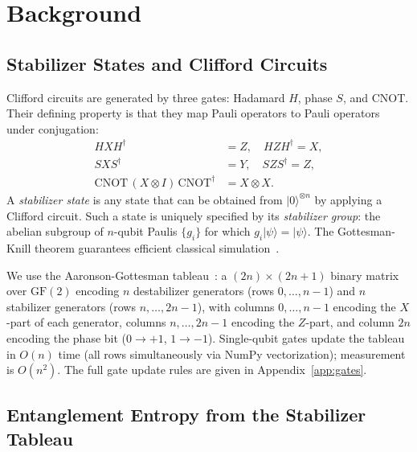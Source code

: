 \documentclass[twocolumn,prl,aps,floatfix]{revtex4-2}
\begin{document}
\section{Background}
\label{sec:background}

\subsection{Stabilizer States and Clifford Circuits}

Clifford circuits are generated by three gates: Hadamard $H$, phase $S$, and CNOT.
Their defining property is that they map Pauli operators to Pauli operators under
conjugation:
\begin{align}
  H X H^\dagger &= Z, \quad H Z H^\dagger = X, \nonumber\\
  S X S^\dagger &= Y, \quad S Z S^\dagger = Z, \nonumber\\
  \mathrm{CNOT}\,(X \otimes I)\,\mathrm{CNOT}^\dagger &= X \otimes X.
\end{align}
A \textit{stabilizer state} is any state that can be obtained from $|0\rangle^{\otimes n}$
by applying a Clifford circuit.
Such a state is uniquely specified by its \textit{stabilizer group}:
the abelian subgroup of $n$-qubit Paulis $\{g_i\}$ for which $g_i|\psi\rangle = |\psi\rangle$.
The Gottesman-Knill theorem guarantees efficient classical simulation~\cite{Gottesman1998}.

We use the Aaronson-Gottesman tableau~\cite{Aaronson2004}: a $(2n) \times (2n+1)$
binary matrix over $\mathrm{GF}(2)$ encoding $n$ destabilizer generators (rows $0,\ldots,n-1$)
and $n$ stabilizer generators (rows $n,\ldots,2n-1$), with columns $0,\ldots,n-1$
encoding the $X$-part of each generator, columns $n,\ldots,2n-1$ encoding the $Z$-part,
and column $2n$ encoding the phase bit ($0 \to +1$, $1 \to -1$).
Single-qubit gates update the tableau in $O(n)$ time (all rows simultaneously
via NumPy vectorization); measurement is $O(n^2)$.
The full gate update rules are given in Appendix~\ref{app:gates}.

\subsection{Entanglement Entropy from the Stabilizer Tableau}
\end{document}
